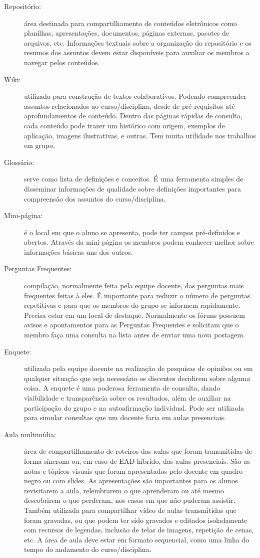 \begin{description}
\item[Repositório:] área destinada para compartilhamento de conteúdos eletrônicos como planilhas, apresentações, documentos, páginas externas, pacotes de arquivos, etc. Informações textuais sobre a organização do repositório e os resumos dos assuntos devem estar disponíveis para auxiliar os membros a navegar pelos conteúdos.
\item[Wiki:] utilizada para construção de textos colaborativos. Podendo compreender assuntos relacionados ao curso/disciplina, desde de pré-requisitos até aprofundamentos de conteúdo. Dentro das páginas rápidas de consulta, cada conteúdo pode trazer um histórico com origem, exemplos de aplicação, imagens ilustrativas, e outras. Tem muita utilidade nos trabalhos em grupo.
\item[Glossário:] serve como lista de definições e conceitos. É uma ferramenta simples de disseminar informações de qualidade sobre definições importantes para compreensão dos assuntos do curso/disciplina.
\item[Mini-página:] é o local em que o aluno se apresenta, pode ter campos pré-definidos e abertos. Através da mini-página os membros podem conhecer melhor sobre informações básicas uns dos outros.
\item[Perguntas Frequentes:] compilação, normalmente feita pela equipe docente, das perguntas mais frequentes feitas à eles. É importante para reduzir o número de perguntas repetitivas e para que os membros do grupo se informem rapidamente. Precisa estar em um local de destaque. Normalmente os fóruns possuem avisos e apontamentos para as Perguntas Frequentes e solicitam que o membro faça uma consulta na lista antes de enviar uma nova postagem.
\item[Enquete:] utilizada pela equipe docente na realização de pesquisas de opiniões ou em qualquer situação que seja necessário os discentes decidirem sobre alguma coisa. A enquete é uma poderosa ferramenta de consulta, dando visibilidade e transparência sobre os resultados, além de auxiliar na participação do grupo e na autoafirmação individual. Pode ser utilizada para simular consultas que um docente faria em aulas presenciais.
\item[Aula multimídia:] área de compartilhamento de roteiros das aulas que foram transmitidas de forma síncrona ou, em caso de EAD híbrido, das aulas presenciais. São as notas e tópicos visuais que foram apresentados pelo docente em quadro negro ou com slides. As apresentações são importantes para os alunos revisitarem a aula, relembrarem o que aprenderam ou até mesmo descobrirem o que perderam, nos casos em que não puderam assistir. Também utilizada para compartilhar vídeo de aulas transmitidas que foram gravadas, ou que podem ter sido gravados e editados isoladamente com recursos de legendas, inclusão de telas de imagens, repetição de cenas, etc. A área de aula deve estar em formato sequencial, como uma linha do tempo do andamento do curso/disciplina.

\end{description}
